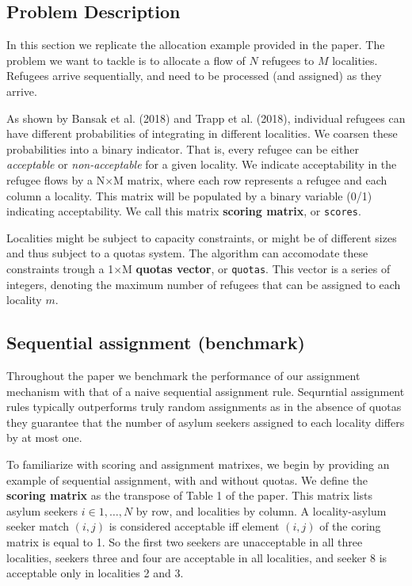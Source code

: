 \documentclass[11pt]{article}
\begin{document}
    \hypertarget{problem-description}{%
\subsection{Problem Description}\label{problem-description}}

In this section we replicate the allocation example provided in the
paper. The problem we want to tackle is to allocate a flow of \(N\)
refugees to \(M\) localities. Refugees arrive sequentially, and need to
be processed (and assigned) as they arrive.

As shown by Bansak et al. (2018) and Trapp et al. (2018), individual
refugees can have different probabilities of integrating in different
localities. We coarsen these probabilities into a binary indicator. That
is, every refugee can be either \emph{acceptable} or
\emph{non-acceptable} for a given locality. We indicate acceptability in
the refugee flows by a N\(\times\)M matrix, where each row represents a
refugee and each column a locality. This matrix will be populated by a
binary variable (0/1) indicating acceptability. We call this matrix
\textbf{scoring matrix}, or \texttt{scores}.

Localities might be subject to capacity constraints, or might be of
different sizes and thus subject to a quotas system. The algorithm can
accomodate these constraints trough a 1\(\times\)M \textbf{quotas
vector}, or \texttt{quotas}. This vector is a series of integers,
denoting the maximum number of refugees that can be assigned to each
locality \(m\).

\hypertarget{sequential-assignment-benchmark}{%
\subsection{Sequential assignment
(benchmark)}\label{sequential-assignment-benchmark}}

Throughout the paper we benchmark the performance of our assignment
mechanism with that of a naive sequential assignment rule. Sequrntial
assignment rules typically outperforms truly random assignments as in
the absence of quotas they guarantee that the number of asylum seekers
assigned to each locality differs by at most one.

To familiarize with scoring and assignment matrixes, we begin by
providing an example of sequential assignment, with and without quotas.
We define the \textbf{scoring matrix} as the transpose of Table 1 of the
paper. This matrix lists asylum seekers \(i\in{1,\ldots,N}\) by row, and
localities by column. A locality-asylum seeker match \((i,j)\) is
considered acceptable iff element \((i,j)\) of the coring matrix is
equal to 1. So the first two seekers are unacceptable in all three
localities, seekers three and four are acceptable in all localities, and
seeker 8 is acceptable only in localities 2 and 3.
\end{document}
